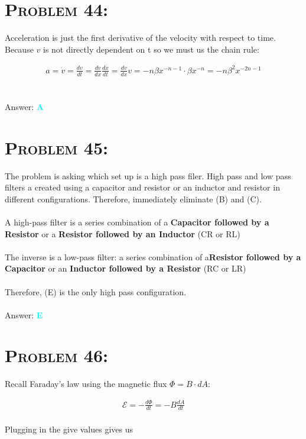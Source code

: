 \documentclass{article}
\begin{document}
\section{\textsc{Problem 44:}} Acceleration is just the first derivative of the velocity with respect to time. Because $v$ is not directly dependent on t so we must us the chain rule:

\begin{gather}
a = \dot{v} = \frac{dv}{dt} = \frac{dv}{dx} \frac{dx}{dt} = \frac{dv}{dx} v = -n\beta x^{-n-1} \cdot \beta x^{-n} = \boxed{-n \beta^{2} x^{-2n-1}}
\end{gather}
\\\\
Answer: \textbf{\textcolor{cyan}A}\\


\section{\textsc{Problem 45:}} The problem is asking which set up is a high pass filer. High pass and low pass filters a created using a capacitor and resistor or an inductor and resistor in different configurations. Therefore, immediately eliminate (B) and (C).\\
\\
 A high-pass filter is a series combination of a \textbf{Capacitor followed by a Resistor} or a \textbf{Resistor followed by an Inductor} (CR or RL)\\
 \\
The inverse is a low-pass filter: a series combination of a\textbf{Resistor followed by a Capacitor} or an \textbf{Inductor followed by a Resistor} (RC or LR)\\
\\
Therefore, (E) is the only high pass configuration.
\\\\
Answer: \textbf{\textcolor{cyan}E}\\


\section{\textsc{Problem 46:}} Recall Faraday's law using the magnetic flux $\Phi = B \cdot dA$:

\begin{gather}
\label{eq:faraday}\mathcal{E} = -  \frac{d \Phi}{dt} = - B\frac{dA}{dt}
\end{gather}
\\
Plugging in the give values gives us
\end{document}
